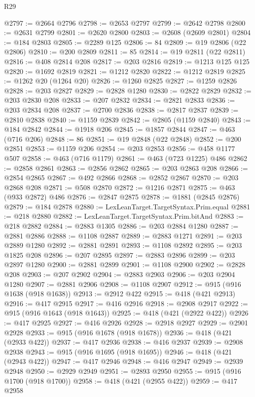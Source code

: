 \begin{lexlean}{R29}
\begin{coremodule}
@2797 := @2664 @2796
@2798 := @2653 @2797
@2799 := @2642 @2798
@2800 := @2631 @2799
@2801 := @2620 @2800
@2803 := @2608 (@2609 @2801)
@2804 := @184 @2803
@2805 := @2289 @125
@2806 := 84
@2809 := @19 @2806 (@22 @2806)
@2810 := @200 @2809
@2811 := 85
@2814 := @19 @2811 (@22 @2811)
@2816 := @408 @2814 @208
@2817 := @203 @2816
@2819 := @1213 @125 @125
@2820 := @1692 @2819
@2821 := @1212 @2820
@2822 := @1212 @2819
@2825 := @1262 @20 (@1264 @20)
@2826 := @1260 @2825
@2827 := @1259 @2826
@2828 := @203 @2827
@2829 := @2828 @1280
@2830 := @2822 @2829
@2832 := @203 @2830 @208
@2833 := @207 @2832
@2834 := @2821 @2833
@2836 := @203 @2834 @208
@2837 := @2700 @2836
@2838 := @2817 @2837
@2839 := @2810 @2838
@2840 := @1159 @2839
@2842 := @2805 (@1159 @2840)
@2843 := @184 @2842
@2844 := @1918 @206
@2845 := @1857 @2844
@2847 := @463 (@716 @206)
@2848 := 86
@2851 := @19 @2848 (@22 @2848)
@2852 := @200 @2851
@2853 := @1159 @206
@2854 := @203 @2853
@2856 := @458 @1177 @507
@2858 := @463 (@716 @1179)
@2861 := @463 (@723 @1225) @486
@2862 := @2858 @2861
@2863 := @2856 @2862
@2865 := @203 @2863 @208
@2866 := @2854 @2865
@2867 := @492 @2866
@2868 := @2852 @2867
@2870 := @203 @2868 @208
@2871 := @508 @2870
@2872 := @1216 @2871
@2875 := @463 (@933 @2872) @486
@2876 := @2847 @2875
@2878 := @1881 (@2845 @2876)
@2879 := @184 @2878
@2880 := LexLeanTarget.TargetSyntax.Prim.equal
@2881 := @218 @2880
@2882 := LexLeanTarget.TargetSyntax.Prim.bitAnd
@2883 := @218 @2882
@2884 := @2883 @1305
@2886 := @203 @2884 @1280
@2887 := @2881 @2886
@2888 := @1108 @2887
@2889 := @2883 @1271
@2891 := @203 @2889 @1280
@2892 := @2881 @2891
@2893 := @1108 @2892
@2895 := @203 @1825 @208
@2896 := @207 @2895
@2897 := @2883 @2896
@2899 := @203 @2897 @1280
@2900 := @2881 @2899
@2901 := @1108 @2900
@2902 := @2828 @208
@2903 := @207 @2902
@2904 := @2883 @2903
@2906 := @203 @2904 @1280
@2907 := @2881 @2906
@2908 := @1108 @2907
@2912 := @915 (@916 @1638 (@918 @1638))
@2913 := @2912 @422
@2915 := @418 (@421 @2913)
@2916 := @417 @2915
@2917 := @416 @2916
@2918 := @2908 @2917
@2922 := @915 (@916 @1643 (@918 @1643))
@2925 := @418 (@421 (@2922 @422))
@2926 := @417 @2925
@2927 := @416 @2926
@2928 := @2918 @2927
@2929 := @2901 @2928
@2933 := @915 (@916 @1678 (@918 @1678))
@2936 := @418 (@421 (@2933 @422))
@2937 := @417 @2936
@2938 := @416 @2937
@2939 := @2908 @2938
@2943 := @915 (@916 @1695 (@918 @1695))
@2946 := @418 (@421 (@2943 @422))
@2947 := @417 @2946
@2948 := @416 @2947
@2949 := @2939 @2948
@2950 := @2929 @2949
@2951 := @2893 @2950
@2955 := @915 (@916 @1700 (@918 @1700))
@2958 := @418 (@421 (@2955 @422))
@2959 := @417 @2958

\end{coremodule}
\end{lexlean}
